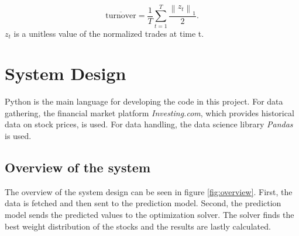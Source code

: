 \documentclass{LTHtwocol} %
\begin{document}
$$
\overline{\text{turnover}} = \frac{1}{T}\sum_{t=1}^{T}\frac{\left\lVert z_{t} \right\rVert_{1} }{2}.
$$
$z_{t}$ is a unitless value of the normalized trades at time t.


\section{System Design}


Python is the main language for developing the code in this project. For data gathering, the financial market platform \textit{Investing.com}, which provides historical data on stock prices, is used. For data handling, the data science library \textit{Pandas} is used. 
\subsection{Overview of the system}
The overview of the system design can be seen in figure \ref{fig:overview}. First, the data is fetched and then sent to the prediction model. Second, the prediction model sends the predicted values to the optimization solver. The solver finds  the best weight distribution of the stocks and the results are lastly calculated.
\end{document}
